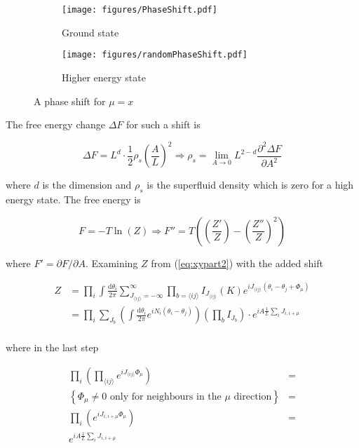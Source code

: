 \begin{figure}[h!]
\centering
    \begin{subfigure}{.4\textwidth}
        \centering
        \texttt{[image: figures/PhaseShift.pdf]}
        \caption{Ground state}
        \label{fig:xyground}
    \end{subfigure}
    \begin{subfigure}{.4\textwidth}
        \centering
        \texttt{[image: figures/randomPhaseShift.pdf]}
        \caption{Higher energy state}
        \label{fig:xyhigher}
    \end{subfigure}
    \caption{A phase shift for $\mu = x$}
\label{fig:xyphaseshift}
\end{figure}

The free energy change $\Delta F$ for such a shift is

\begin{equation}
    \Delta F = L^d \cdot \frac{1}{2} \rho_s \left( \frac{A}{L} \right)^2 \Rightarrow \rho_s = \lim_{A \to 0} L^{2 - d}\frac{\partial^2 \Delta F}{\partial A^2}
\end{equation}

where $d$ is the dimension and $\rho_s$ is the superfluid density which is zero for a high energy state. The free energy is

\begin{equation}
F = - T \ln(Z) \Rightarrow F'' = T \left(\left(\frac{Z'}{Z}\right) - \left( \frac{Z''}{Z} \right)^2 \right)
\label{eq:xyfreeenergy}
\end{equation}

where $F' = \partial F / \partial A$. Examining $Z$ from (\ref{eq:xypart2}) with the added shift

\begin{align}
    Z &= \prod_i \int \frac{\mathrm d \theta_i}{2 \pi} \sum_{J_{\langle ij \rangle} = -\infty}^{\infty} \prod_{b = \langle ij \rangle} I_{J_{\langle ij \rangle}} ( K ) e^{i J_{\langle ij \rangle} (\theta_i - \theta_j + \Phi_\mu)} \\
%
    & = \prod_i \sum_{J_b} \left ( \int \frac{\mathrm d \theta_i}{2 \pi} e^{i N_i (\theta_i - \theta_j)} \right ) \left ( \prod_b I_{J_b} \right ) \cdot e^{i A \frac{1}{L} \sum_i J_{i, i+\mu}} \\
\label{eq:xypart3}
\end{align}

where in the last step

\begin{align}
    \prod_i \left (\prod_{\langle ij \rangle} e^{i J_{\langle ij \rangle} \Phi_\mu} \right) &= \\
%
    \left\{ \text{$\Phi_\mu \neq 0$ only for neighbours in the $\mu$ direction} \right \} &= \\
%
    \prod_i \left ( e^{iJ_{i, i+\mu} \Phi_\mu} \right ) &= \\
%
    e^{iA \frac{1}{L} \sum_i J_{i, i+\mu}}
\end{align}


